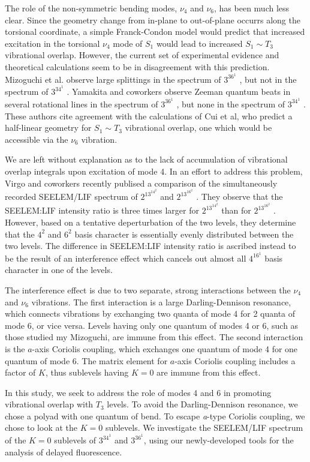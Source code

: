 \documentclass[12pt]{mitthesis}
\begin{document}
The role of the non-symmetric bending modes, $\nu_4$ and $\nu_6$, has
been much less clear.  Since the geometry change from in-plane to
out-of-plane occurrs along the torsional coordinate, a simple
Franck-Condon model would predict that increased excitation in the
torsional $\nu_4$ mode of $S_1$ would lead to increased $S_1 \sim T_3$
vibrational overlap.  However, the current set of experimental
evidence and theoretical calculations seem to be in disagreement with
this prediction.  Mizoguchi et al. observe large splittings in the
spectrum of $3^36^1$ , but not in the spectrum of $3^34^1$
.  Yamakita and coworkers observe Zeeman quantum beats in
several rotational lines in the spectrum of $3^36^1$ , but none
in the spectrum of $3^34^1$ .  These authors cite agreement with
the calculations of Cui et al, who predict a half-linear geometry for $S_1 \sim
T_3$ vibrational overlap, one which would be accessible via the $\nu_6$
vibration.

We are left without explanation as to the lack of accumulation of
vibrational overlap integrals upon excitation of mode 4.  In an effort
to address this problem, Virgo and coworkers recently publised a
comparison of the simultaneously recorded SEELEM/LIF spectrum of
$2^13^14^2$  and $2^13^16^2$ .  They observe that the
SEELEM:LIF intensity ratio is three times larger for $2^13^14^2$
 than for $2^13^16^2$ .  However, based on a tentative
deperturbation of the two levels, they determine that the $4^2$ and
$6^2$ basis character is essentially evenly distributed between the
two levels.  The difference in SEELEM:LIF intensity ratio is ascribed
instead to be the result of an interference effect which cancels out
almost all $4^16^1$ basis character in one of the levels.

The interference effect is due to two separate, strong interactions
between the $\nu_4$ and $\nu_6$ vibrations.  The first interaction is
a large Darling-Dennison resonance, which connects vibrations
by exchanging two quanta of mode 4 for 2 quanta of mode 6, or vice
versa.  Levels having only one quantum of modes 4 or 6, such as those
studied my Mizoguchi, are immune from this effect.  The second
interaction is the $a$-axis Coriolis coupling, which exchanges one
quantum of mode 4 for one quantum of mode 6.  The matrix element for 
$a$-axis Coriolis coupling includes a factor of $K$, thus sublevels
having $K=0$ are immune from this effect.

In this study, we seek to address the role of modes 4 and 6 in
promoting vibrational overlap with $T_3$ levels.  To avoid the
Darling-Dennison resonance, we chose a polyad with one quantum of
bend.  To escape \emph{a}-type Coriolis coupling, we chose to look at
the $K=0$ sublevels.  We investigate the SEELEM/LIF spectrum of the
$K=0$ sublevels of $3^34^1$ and $3^36^1$, using our newly-developed
tools for the analysis of delayed fluorescence.
\end{document}
